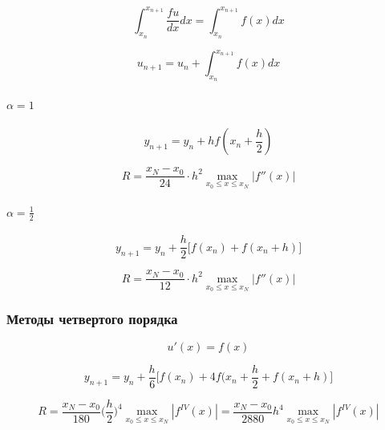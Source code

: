 \begin{equation*}
    \int_{x_n}^{x_{n+1}} \frac{fu}{dx} dx =
    \int_{x_n}^{x_{n+1}} f(x) dx
\end{equation*}

\begin{equation*}
    u_{n+1} = u_n + \int_{x_n}^{x_{n+1}} f(x) dx
\end{equation*}

\paragraph{$\alpha = 1$}

\begin{equation*}
    y_{n+1} = y_n + h f(x_n + \frac{h}{2})
\end{equation*}

\begin{equation*}
    R = \frac{x_N - x_0}{24} \cdot h^2
    \underset{x_0 \le x \le x_N}{\max} |f''(x)|
\end{equation*}

\paragraph{$\alpha = \frac{1}{2}$}

\begin{equation*}
    y_{n+1} = y_n + \frac{h}{2} \bigg[ f(x_n) + f(x_n + h) \bigg]
\end{equation*}

\begin{equation*}
    R = \frac{x_N - x_0}{12} \cdot h^2
    \underset{x_0 \le x \le x_N}{\max} |f''(x)|
\end{equation*}

\subsubsection{Методы четвертого порядка}

\begin{equation*}
    u'(x) = f(x)
\end{equation*}

\begin{equation*}
    y_{n+1} = y_n + \frac{h}{6} \bigg[ f(x_n) +
    4 f(x_n + \frac{h}{2} + f(x_n + h) \bigg]
\end{equation*}

\begin{equation*}
    R = \frac{x_N - x_0}{180} \bigg( \frac{h}{2} \bigg) ^4
    \underset{x_0 \le x \le x_N}{\max} |f^{IV}(x)| =
    \frac{x_N - x_0}{2880} h^4
    \underset{x_0 \le x \le x_N}{\max} |f^{IV}(x)|
\end{equation*}


